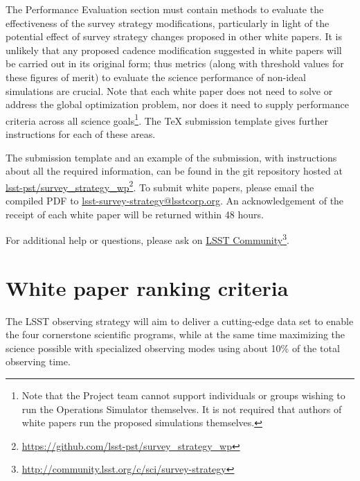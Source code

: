 \documentclass[DM,lsstdraft,toc,usenatbib]{lsstdoc}
\begin{document}
The Performance Evaluation section must contain methods to evaluate the effectiveness of the survey strategy modifications, particularly in light of the potential effect of survey strategy changes proposed in other white papers. It is unlikely that any proposed cadence modification suggested in white papers will be carried out in its original form; thus metrics (along with threshold values for these figures of merit) to evaluate the science performance of non-ideal simulations are crucial.  Note that each white paper does not need to solve or address the global optimization problem, nor does it need to supply performance criteria across all science goals\footnote{Note that 
the Project team cannot support individuals or groups wishing to run the Operations Simulator themselves. It is not required that authors of white papers run the proposed simulations themselves.}. The TeX submission template gives further instructions for each of these areas.

The submission template and an example of the submission, with instructions about
all the required information, can be found in the git repository hosted at \href{https://github.com/lsst-pst/survey_strategy_wp}{lsst-pst/survey\_strategy\_wp}\footnote{\url{https://github.com/lsst-pst/survey_strategy_wp}}.
To submit white papers, please email the compiled PDF to \href{lsst-survey-strategy@lsstcorp.org}{lsst-survey-strategy@lsstcorp.org}. An acknowledgement
of the receipt of each white paper will be returned within 48 hours.

For additional help or questions, please ask on \href{https://community.lsst.org/c/sci}{LSST Community}\footnote{\url{http://community.lsst.org/c/sci/survey-strategy}}. 


\section{White paper ranking criteria \label{sec:ranking}} 

The LSST observing strategy will aim to deliver a cutting-edge data set to enable
the four cornerstone scientific programs, while at the same time maximizing the 
science possible with specialized observing modes using about 10\% of the total observing time. 
\end{document}
